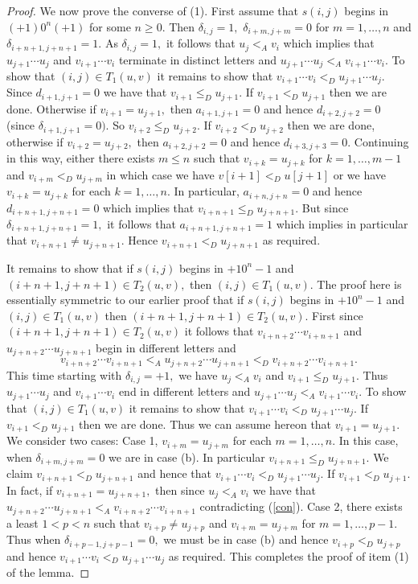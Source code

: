 \documentclass[10pt,a4paper]{amsart}
\begin{document}
\begin{proof}
We now prove the converse of (1). First assume that $s(i,j)$ begins in $(+1)0^n(+1)$ for some $n\geq 0.$ Then $\delta_{i,j}=1,$ $\delta_{i+m,j+m}=0$ for $m=1,\ldots, n$ and $\delta_{i+n+1,j+n+1}=1.$ As $\delta_{i,j}=1,$  it follows that $u_j<_A v_i$ which implies that $u_{j+1}\cdots u_j$ and $v_{i+1}\cdots v_i$ terminate in distinct letters and  $u_{j+1}\cdots u_j<_A v_{i+1}\cdots v_i.$ To show that $(i,j)\in T_1(u,v)$ it remains to show that 
$v_{i+1}\cdots v_i<_D u_{j+1}\cdots u_j.$   Since $d_{i+1,j+1}=0$ we have that $v_{i+1}\leq _D u_{j+1}.$ If $v_{i+1}<_Du_{j+1}$ then we are done. Otherwise if $v_{i+1}=u_{j+1},$
 then $a_{i+1,j+1}=0$ and hence $d_{i+2,j+2}=0$ (since $\delta_{i+1,j+1}=0).$ So $v_{i+2}\leq_D u_{j+2}.$ If $v_{i+2}<_D u_{j+2}$ then we are done, otherwise if $v_{i+2}=u_{j+2},$ then $a_{i+2,j+2}=0$ and hence $d_{i+3,j+3}=0.$  Continuing in this way, either there exists $m\leq n$ such that $v_{i+k}=u_{j+k}$ for $k=1,\ldots ,m-1$ and $v_{i+m}<_D u_{j+m}$ in which case we have $v[i+1]<_D u[j+1]$ or we have $v_{i+k}=u_{j+k}$ for each $k=1,\ldots ,n.$ In particular, $a_{i+n,j+n}=0$ and hence $d_{i+n+1,j+n+1}=0$ which implies that $v_{i+n+1}\leq_D u_{j+n+1}.$ But since $\delta_{i+n+1,j+n+1}=1,$ it follows that $a_{i+n+1,j+n+1}=1$ which implies in particular that $v_{i+n+1}\neq u_{j+n+1}.$ Hence  $v_{i+n+1}<_D u_{j+n+1}$ as required. 
 
 It remains to show that if $s(i,j)$ begins in $+10^n-1$ and $(i+n+1,j+n+1)\in T_2(u,v),$ then $(i,j)\in T_1(u,v).$ The proof here is essentially symmetric to our earlier proof that if $s(i,j)$ begins in $+10^n-1$  and $(i,j)\in T_1(u,v)$ then $(i+n+1,j+n+1)\in T_2(u,v).$ 
First since $(i+n+1,j+n+1)\in T_2(u,v)$ it follows that $v_{i+n+2}\cdots v_{i+n+1}$ and $u_{j+n+2}\cdots u_{j+n+1}$ begin in different letters and
\begin{equation}\label{con}v_{i+n+2}\cdots v_{i+n+1} <_A  u_{j+n+2}\cdots u_{j+n+1}   <_D v_{i+n+2}\cdots v_{i+n+1}.\end{equation}
This time starting with $\delta_{i,j}=+1,$ we have $u_j<_A v_i$ and $v_{i+1}\leq _D u_{j+1}.$ Thus $u_{j+1}\cdots u_j$ and $v_{i+1}\cdots v_i$ end in different letters and $u_{j+1}\cdots u_j <_A v_{i+1}\cdots v_i.$ To show that $(i,j)\in T_1(u,v)$ it remains to show that $v_{i+1}\cdots v_i <_D  u_{j+1}\cdots u_j.$ If $v_{i+1}<_D u_{j+1}$ then we are done. Thus we can assume hereon that $v_{i+1}=u_{j+1}.$ We consider two cases: Case 1,  $v_{i+m}=u_{j+m}$ for each $m=1,\ldots ,n.$ In this case, when $\delta_{i+m,j+m}=0$ we are in case (b).  In particular $v_{i+n+1}\leq _D u_{j+n+1}.$ We claim $v_{i+n+1} <_D u_{j+n+1}$ and hence that $v_{i+1}\cdots v_i <_D  u_{j+1}\cdots u_j.$ If $v_{i+1}<_D u_{j+1}.$  In fact,  if  $v_{i+n+1}= u_{j+n+1},$ then since $u_j<_A v_i$ we have that $u_{j+n+2}\cdots u_{j+n+1} <_Av_{i+n+2}\cdots v_{i+n+1}$ contradicting (\ref{con}).
Case 2, there exists a least $1<p<n$ such that $v_{i+p}\neq u_{j+p}$ and $v_{i+m}=u_{j+m}$ for $m=1,\ldots ,p-1.$ Thus when $\delta_{i+p-1,j+p-1}=0,$ we must be in case (b) and hence $v_{i+p}<_D u_{j+p}$ and hence $v_{i+1}\cdots v_i<_D u_{j+1}\cdots u_j$ as required. This completes the proof of item (1)  of the lemma. \end{proof}
\end{document}
